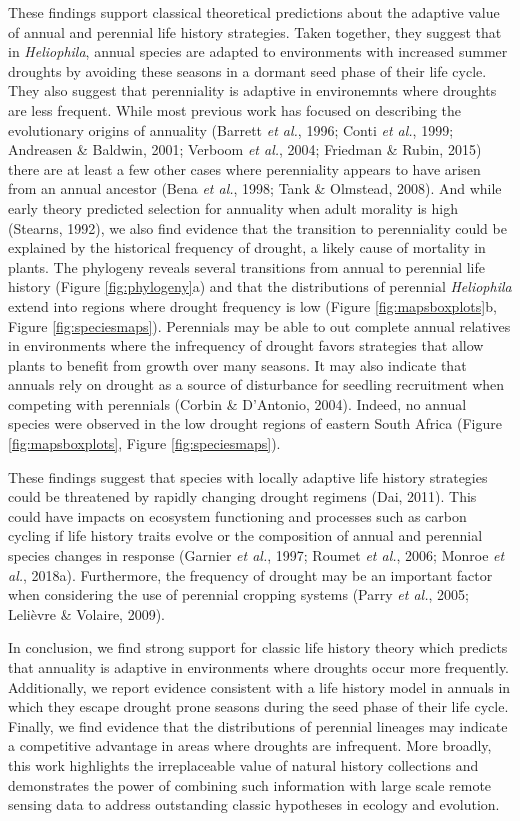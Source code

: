 \documentclass[man,floatsintext]{apa6}
\theoremstyle{definition}
\theoremstyle{definition}
\theoremstyle{definition}
\theoremstyle{remark}
\begin{document}
These findings support classical theoretical predictions about the
adaptive value of annual and perennial life history strategies. Taken
together, they suggest that in \emph{Heliophila}, annual species are
adapted to environments with increased summer droughts by avoiding these
seasons in a dormant seed phase of their life cycle. They also suggest
that perenniality is adaptive in environemnts where droughts are less
frequent. While most previous work has focused on describing the
evolutionary origins of annuality (Barrett \emph{et al.}, 1996; Conti
\emph{et al.}, 1999; Andreasen \& Baldwin, 2001; Verboom \emph{et al.},
2004; Friedman \& Rubin, 2015) there are at least a few other cases
where perenniality appears to have arisen from an annual ancestor (Bena
\emph{et al.}, 1998; Tank \& Olmstead, 2008). And while early theory
predicted selection for annuality when adult morality is high (Stearns,
1992), we also find evidence that the transition to perenniality could
be explained by the historical frequency of drought, a likely cause of
mortality in plants. The phylogeny reveals several transitions from
annual to perennial life history (Figure \ref{fig:phylogeny}a) and that
the distributions of perennial \emph{Heliophila} extend into regions
where drought frequency is low (Figure \ref{fig:mapsboxplots}b, Figure
\ref{fig:speciesmaps}). Perennials may be able to out complete annual
relatives in environments where the infrequency of drought favors
strategies that allow plants to benefit from growth over many seasons.
It may also indicate that annuals rely on drought as a source of
disturbance for seedling recruitment when competing with perennials
(Corbin \& D'Antonio, 2004). Indeed, no annual species were observed in
the low drought regions of eastern South Africa (Figure
\ref{fig:mapsboxplots}, Figure \ref{fig:speciesmaps}).

These findings suggest that species with locally adaptive life history
strategies could be threatened by rapidly changing drought regimens
(Dai, 2011). This could have impacts on ecosystem functioning and
processes such as carbon cycling if life history traits evolve or the
composition of annual and perennial species changes in response (Garnier
\emph{et al.}, 1997; Roumet \emph{et al.}, 2006; Monroe \emph{et al.},
2018a). Furthermore, the frequency of drought may be an important factor
when considering the use of perennial cropping systems (Parry \emph{et
al.}, 2005; Lelièvre \& Volaire, 2009).

In conclusion, we find strong support for classic life history theory
which predicts that annuality is adaptive in environments where droughts
occur more frequently. Additionally, we report evidence consistent with
a life history model in annuals in which they escape drought prone
seasons during the seed phase of their life cycle. Finally, we find
evidence that the distributions of perennial lineages may indicate a
competitive advantage in areas where droughts are infrequent. More
broadly, this work highlights the irreplaceable value of natural history
collections and demonstrates the power of combining such information
with large scale remote sensing data to address outstanding classic
hypotheses in ecology and evolution.
\end{document}
